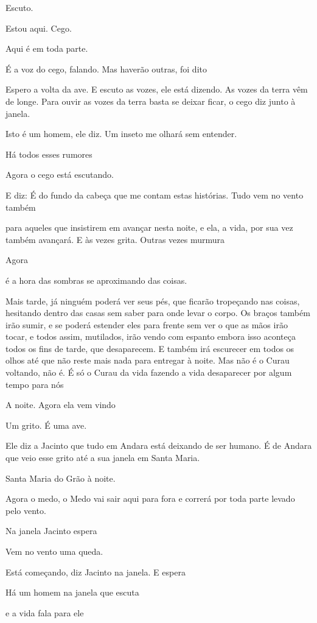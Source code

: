 Escuto.

Estou aqui. Cego.

Aqui é em toda parte.

É a voz do cego, falando. Mas haverão outras, foi dito

Espero a volta da ave. E escuto as vozes, ele está dizendo. As vozes da
terra vêm de longe. Para ouvir as vozes da terra basta se deixar ficar,
o cego diz junto à janela.

Isto é um homem, ele diz. Um inseto me olhará sem entender.

Há todos esses rumores

Agora o cego está escutando.

E diz: É do fundo da cabeça que me contam estas histórias. Tudo vem no
vento também

para aqueles que insistirem em avançar nesta noite, e ela, a vida, por
sua vez também avançará. E às vezes grita. Outras vezes murmura

Agora

é a hora das sombras se aproximando das coisas.

Mais tarde, já ninguém poderá ver seus pés, que ficarão tropeçando nas
coisas, hesitando dentro das casas sem saber para onde levar o corpo. Os
braços também irão sumir, e se poderá estender eles para frente sem ver
o que as mãos irão tocar, e todos assim, mutilados, irão vendo com
espanto embora isso aconteça todos os fins de tarde, que desaparecem. E
também irá escurecer em todos os olhos até que não reste mais nada para
entregar à noite. Mas não é o Curau voltando, não é. É só o Curau da
vida fazendo a vida desaparecer por algum tempo para nós

A noite. Agora ela vem vindo

Um grito. É uma ave.

Ele diz a Jacinto que tudo em Andara está deixando de ser humano. É de
Andara que veio esse grito até a sua janela em Santa Maria.

Santa Maria do Grão à noite.

Agora o medo, o Medo vai sair aqui para fora e correrá por toda parte
levado pelo vento.

Na janela Jacinto espera

Vem no vento uma queda.

Está começando, diz Jacinto na janela. E espera

Há um homem na janela que escuta

e a vida fala para ele

